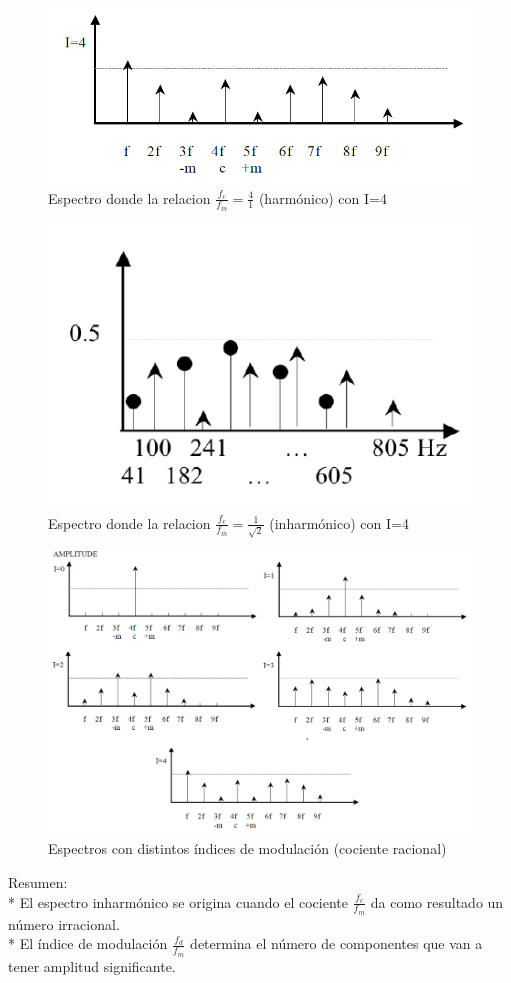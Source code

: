 \documentclass[assd_tp2_main.tex]{subfiles}
\begin{document}
\begin{figure}[H]
\centering
\includegraphics[width=0.5\linewidth]{graficos/EJ4/espectroharmonico.png}
\caption{Espectro donde la relacion $\displaystyle \frac{f_c}{f_m}=\frac{4}{1}$ (harmónico) con I=4 }
\label{fig:harmonico}
\end{figure}

\begin{figure}[H]
\centering
\includegraphics[width=0.3\linewidth]{graficos/EJ4/espectroinharmonico.png}
\caption{Espectro donde la relacion $\displaystyle \frac{f_c}{f_m}=\frac{1}{\sqrt{2}}$ (inharmónico) con I=4}
\label{fig:inharmonico}
\end{figure}

\begin{figure}[H]
\centering
\includegraphics[width=0.8\linewidth]{graficos/EJ4/chowning.png}
\caption{Espectros con distintos índices de modulación (cociente racional)}
\label{fig:chowning}
\end{figure}


Resumen:\\*
El espectro inharmónico se origina cuando el cociente $\displaystyle \frac{f_c}{f_m}$ da como resultado un número irracional. \\*
El índice de modulación $\displaystyle \frac{f_d}{f_m}$ determina el número de componentes que van a tener amplitud significante.
\end{document}

